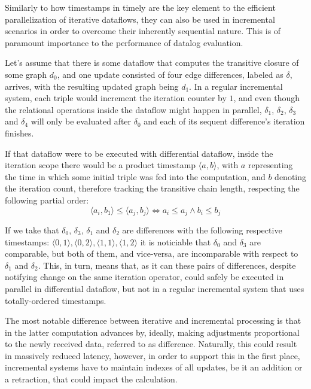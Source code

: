 \documentclass[sigconf,screen,review,natbib]{acmart}
\theoremstyle{definition}
\begin{document}
Similarly to how timestamps in timely are the key element to the efficient parallelization of iterative dataflows, they can also be used in incremental scenarios in order to
overcome their inherently sequential nature. This is of paramount importance to the performance of datalog evaluation.

Let's assume that there is some dataflow that computes the transitive closure of some graph $d_0$, and one update consisted of four edge differences, labeled as $\delta$, arrives, with
the resulting updated graph being $d_1$. In a regular incremental system, each triple would increment the iteration counter by $1$, and even though the relational operations inside
the dataflow might happen in parallel, $\delta_1$, $\delta_2$, $\delta_3$ and $\delta_4$ will only be evaluated after $\delta_0$ and each of its sequent difference's iteration finishes.

If that dataflow were to be executed with differential dataflow, inside the iteration scope there would be a product timestamp $\langle a, b \rangle$, with $a$ representing the time
in which some initial triple was fed into the computation, and $b$ denoting the iteration count, therefore tracking the transitive chain length, respecting the
following partial order: \[\langle a_i, b_1 \rangle \leq \langle a_j, b_j \rangle \iff a_i \leq a_j \wedge b_i \leq b_j\]

If we take that $\delta_0$, $\delta_3$, $\delta_1$ and $\delta_2$ are differences with the following respective timestamps: $\langle 0, 1 \rangle, \langle 0, 2 \rangle, \langle 1, 1 \rangle, \langle 1, 2 \rangle$ it
is noticiable that $\delta_0$ and $\delta_3$ are comparable, but both of them, and vice-versa, are incomparable with respect to $\delta_1$ and $\delta_2$. This, in turn, means that, as it can
these pairs of differences, despite notifying change on the same iteration operator, could safely be executed in parallel in differential dataflow, but not in a regular
incremental system that uses totally-ordered timestamps.

The most notable difference between iterative and incremental processing is that in the latter computation advances by, ideally, making adjustments proportional to the newly
received data, referred to as difference. Naturally, this could result in massively reduced latency, however, in order to support this in the first place, incremental
systems have to maintain indexes of all updates, be it an addition or a retraction, that could impact the calculation.
\end{document}
